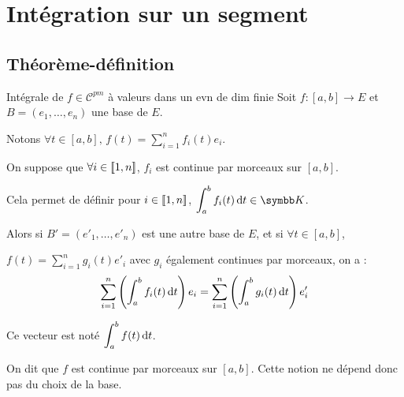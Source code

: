 \section{Intégration sur un segment}
\subsection{Théorème-définition}

\begin{theoreme}{Intégrale de $f \in \mathscr C^{pm}$ à valeurs dans un evn de dim finie}{}
    Soit $f : [a, b] \to E$ et $B = (e_1, \ldots, e_n)$ une base de $E$.

    Notons $\displaystyle \forall t \in [a, b], \, f(t) = \sum_{i=1}^n f_i(t)e_i$.

    On suppose que $\forall i \in [\![1, n]\!]$, $f_i$ est continue par morceaux sur $[a, b]$.

    Cela permet de définir pour $i \in [\![1, n]\!] $, $\displaystyle \int_a^b f_i(t) \dt \in \K$.

    Alors si $B' = (e'_1, \ldots, e'_n)$ est une autre base de $E$, et si 
    $\displaystyle \forall t \in [a, b]$,  
    
    $\displaystyle f(t) = \sum_{i=1}^n g_i(t)e'_i$ avec 
    $g_i$ également continues par morceaux, on a :
    \[\sum_{i=1}^n \left( \int_a^b f_i(t) \,\mathrm{d}t \right) e_i = \sum_{i=1}^n \left( \int_a^b g_i(t) \,\mathrm{d}t \right) e'_i\]

    Ce vecteur est noté $\displaystyle \int_a^b f(t) \,\mathrm{d}t$.

    On dit que $f$ est continue par morceaux sur $[a, b]$. Cette notion ne dépend donc pas 
    du choix de la base.
\end{theoreme}


